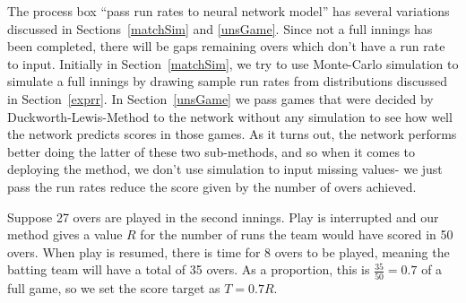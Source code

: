 The process box ``pass run rates to neural network model'' has several variations discussed in Sections~\ref{matchSim} and \ref{unsGame}. Since not a full innings 
has been completed, there will be gaps remaining overs which don't have a run rate to input. Initially in Section~\ref{matchSim}, we try to use Monte-Carlo simulation to simulate a full innings 
by drawing sample run rates from distributions discussed in Section~\ref{exprr}. In Section~\ref{unsGame} we pass games that were decided by Duckworth-Lewis-Method 
to the network without any simulation to see how well the network predicts scores in those games. As it turns out, the network performs better doing the latter of these two 
sub-methods, and so when it comes to deploying the method, we don't use simulation to input missing values- we just pass the run rates reduce the score 
given by the number of overs achieved. 

\begin{example}
    \label{redEx}
    Suppose 27 overs are played in the second innings. Play is interrupted and our method gives a value $R$ for the number of 
    runs the team would have scored in 50 overs. When play is resumed, there is time for 8 overs to be played, meaning the batting team 
    will have a total of 35 overs. As a proportion, this is $\frac{35}{50}=0.7$ of a full game, so we set the score target as $T = 0.7R$.
\end{example}